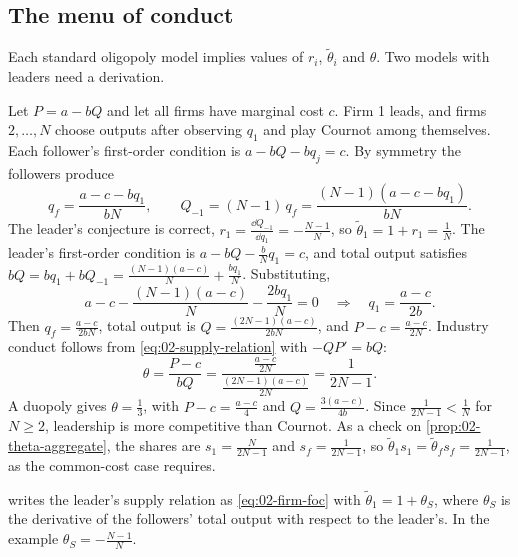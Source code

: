 \subsection{The menu of conduct}\label{sec:02-menu}

Each standard oligopoly model implies values of $r_i$, $\tilde\theta_i$ and $\theta$. Two models with leaders need a
derivation.

\begin{example}\label{ex:02-stackelberg}
Let $P = a - bQ$ and let all firms have marginal cost $c$. Firm 1 leads, and firms $2, \dots, N$ choose outputs
after observing $q_1$ and play Cournot among themselves. Each follower's first-order condition is
$a - bQ - b q_j = c$. By symmetry the followers produce
\begin{equation*}
q_f = \frac{a - c - b q_1}{bN}, \qquad Q_{-1} = (N - 1)\, q_f = \frac{(N - 1)(a - c - b q_1)}{bN} .
\end{equation*}
The leader's conjecture is correct, $r_1 = \frac{\dd Q_{-1}}{\dd q_1} = -\frac{N - 1}{N}$, so
$\tilde\theta_1 = 1 + r_1 = \frac{1}{N}$. The leader's first-order condition is $a - bQ - \frac{b}{N}q_1 = c$, and total output satisfies
$bQ = b q_1 + b Q_{-1} = \frac{(N - 1)(a - c)}{N} + \frac{b q_1}{N}$. Substituting,
\begin{equation*}
a - c - \frac{(N - 1)(a - c)}{N} - \frac{2 b q_1}{N} = 0
\quad\Longrightarrow\quad q_1 = \frac{a - c}{2b} .
\end{equation*}
Then $q_f = \frac{a - c}{2bN}$, total output is $Q = \frac{(2N - 1)(a - c)}{2bN}$, and $P - c = \frac{a - c}{2N}$.
Industry conduct follows from \eqref{eq:02-supply-relation} with $-QP' = bQ$:
\begin{equation*}
\theta = \frac{P - c}{bQ} = \frac{\frac{a - c}{2N}}{\frac{(2N - 1)(a - c)}{2N}} = \frac{1}{2N - 1} .
\end{equation*}
A duopoly gives $\theta = \frac{1}{3}$, with $P - c = \frac{a - c}{4}$ and $Q = \frac{3(a - c)}{4b}$. Since
$\frac{1}{2N - 1} < \frac{1}{N}$ for $N \ge 2$, leadership is more competitive than Cournot. As a check on
\cref{prop:02-theta-aggregate}, the shares are $s_1 = \frac{N}{2N - 1}$ and $s_f = \frac{1}{2N - 1}$, so
$\tilde\theta_1 s_1 = \tilde\theta_f s_f = \frac{1}{2N - 1}$, as the common-cost case requires.
\end{example}

\citet[p.~1022]{Bresnahan1989} writes the leader's supply relation as \eqref{eq:02-firm-foc} with
$\tilde\theta_1 = 1 + \theta_S$, where $\theta_S$ is the derivative of the followers' total output with respect to
the leader's. In the example $\theta_S = -\frac{N - 1}{N}$.

